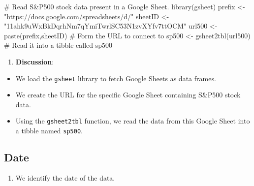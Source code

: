 \documentclass[
  letterpaper,
  DIV=11,
  numbers=noendperiod]{scrreport}
\newenvironment{Shaded}{\begin{snugshade}}{\end{snugshade}}
\newcommand{\CommentTok}[1]{\textcolor[rgb]{0.37,0.37,0.37}{#1}}
\newcommand{\FunctionTok}[1]{\textcolor[rgb]{0.28,0.35,0.67}{#1}}
\newcommand{\NormalTok}[1]{\textcolor[rgb]{0.00,0.23,0.31}{#1}}
\newcommand{\OtherTok}[1]{\textcolor[rgb]{0.00,0.23,0.31}{#1}}
\newcommand{\SpecialCharTok}[1]{\textcolor[rgb]{0.37,0.37,0.37}{#1}}
\newcommand{\StringTok}[1]{\textcolor[rgb]{0.13,0.47,0.30}{#1}}
\providecommand{\tightlist}{%
  \setlength{\itemsep}{0pt}\setlength{\parskip}{0pt}}\usepackage{longtable,booktabs,array}
\begin{document}
\begin{Shaded}
\begin{Highlighting}[]
\CommentTok{\# Read S\&P500 stock data present in a Google Sheet.}
\FunctionTok{library}\NormalTok{(gsheet)}
\NormalTok{prefix }\OtherTok{\textless{}{-}} \StringTok{"https://docs.google.com/spreadsheets/d/"}
\NormalTok{sheetID }\OtherTok{\textless{}{-}} \StringTok{"11ahk9uWxBkDqrhNm7qYmiTwrlSC53N1zvXYfv7ttOCM"}
\NormalTok{url500 }\OtherTok{\textless{}{-}} \FunctionTok{paste}\NormalTok{(prefix,sheetID) }\CommentTok{\# Form the URL to connect to}
\NormalTok{sp500 }\OtherTok{\textless{}{-}} \FunctionTok{gsheet2tbl}\NormalTok{(url500) }\CommentTok{\# Read it into a tibble called sp500}
\end{Highlighting}
\end{Shaded}

\begin{enumerate}
\def\labelenumi{\arabic{enumi}.}
\setcounter{enumi}{2}
\tightlist
\item
  \textbf{Discussion}:
\end{enumerate}

\begin{itemize}
\item
  We load the \texttt{gsheet} library to fetch Google Sheets as data
  frames.
\item
  We create the URL for the specific Google Sheet containing S\&P500
  stock data.
\item
  Using the \texttt{gsheet2tbl} function, we read the data from this
  Google Sheet into a tibble named \texttt{sp500}.
\end{itemize}

\hypertarget{date}{%
\subsection{Date}\label{date}}

\begin{enumerate}
\def\labelenumi{\arabic{enumi}.}
\setcounter{enumi}{3}
\tightlist
\item
  We identify the date of the data.
\end{enumerate}

\begin{Shaded}
\end{Shaded}
\end{document}
